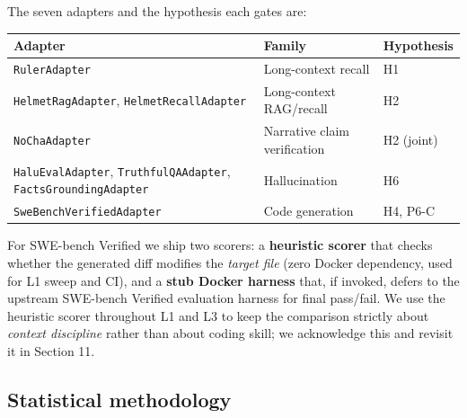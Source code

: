 The seven adapters and the hypothesis each gates are:

{\def\LTcaptype{none} %
\begin{longtable}[]{@{}
  >{\raggedright\arraybackslash}p{}
  >{\raggedright\arraybackslash}p{}
  >{\raggedright\arraybackslash}p{}@{}}
\toprule\noalign{}
\begin{minipage}[b]{\linewidth}\raggedright
Adapter
\end{minipage} & \begin{minipage}[b]{\linewidth}\raggedright
Family
\end{minipage} & \begin{minipage}[b]{\linewidth}\raggedright
Hypothesis
\end{minipage} \\
\midrule\noalign{}
\endhead
\bottomrule\noalign{}
\endlastfoot
\passthrough{\lstinline!RulerAdapter!} & Long-context recall & H1 \\
\passthrough{\lstinline!HelmetRagAdapter!}, \passthrough{\lstinline!HelmetRecallAdapter!} & Long-context RAG/recall & H2 \\
\passthrough{\lstinline!NoChaAdapter!} & Narrative claim verification & H2 (joint) \\
\passthrough{\lstinline!HaluEvalAdapter!}, \passthrough{\lstinline!TruthfulQAAdapter!}, \passthrough{\lstinline!FactsGroundingAdapter!} & Hallucination & H6 \\
\passthrough{\lstinline!SweBenchVerifiedAdapter!} & Code generation & H4, P6-C \\
\end{longtable}
}

For SWE-bench Verified \citep{openai2024sweverified, jimenez2024swebench} we ship two scorers: a \textbf{heuristic scorer} that checks whether the generated diff modifies the \emph{target file} (zero Docker dependency, used for L1 sweep and CI), and a \textbf{stub Docker harness} that, if invoked, defers to the upstream SWE-bench Verified evaluation harness for final pass/fail. We use the heuristic scorer throughout L1 and L3 to keep the comparison strictly about \emph{context discipline} rather than about coding skill; we acknowledge this and revisit it in Section 11.

\subsection{Statistical methodology}\label{statistical-methodology}

